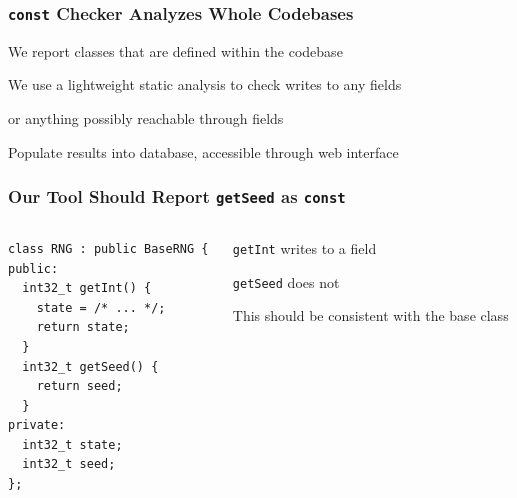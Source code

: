 \documentclass[aspectratio=169]{beamer}
\begin{document}
  \begin{frame}
    \frametitle{\texttt{const} Checker Analyzes Whole Codebases}

    We report classes that are defined within the codebase

    \vspace{2em}

    We use a lightweight static analysis to check writes to any
    fields

    \hspace{1em} or anything possibly reachable through fields

    \vspace{2em}

    Populate results into database, accessible through web interface
  \end{frame}

  \begin{frame}[fragile]
    \frametitle{Our Tool Should Report \texttt{getSeed} as \texttt{const}}

    \begin{columns}
      \begin{column}{0.4\textwidth}
        \begin{lstlisting}
class RNG : public BaseRNG {
public:
  int32_t getInt() {
    state = /* ... */;
    return state;
  }
  int32_t getSeed() {
    return seed;
  }
private:
  int32_t state;
  int32_t seed;
};
        \end{lstlisting}
      \end{column}
      \begin{column}{0.5\textwidth}
        \texttt{getInt} writes to a field

        \vspace{1em}

        \texttt{getSeed} does not 

        \vspace{4em}

        This should be consistent with the base class
      \end{column}
    \end{columns}
  \end{frame}
\end{document}
